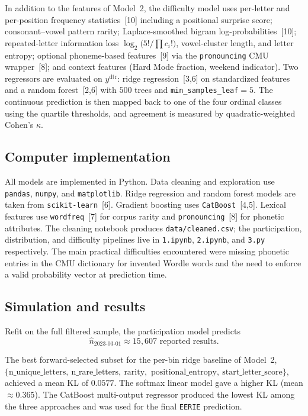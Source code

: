 \documentclass{article}
\begin{document}
In addition to the features of Model~2, the difficulty model uses per-letter
and per-position frequency statistics~[10] including a positional surprise
score; consonant--vowel pattern rarity; Laplace-smoothed bigram
log-probabilities~[10]; repeated-letter information loss
$\log_2\!\bigl(5!/\prod c_i!\bigr)$, vowel-cluster length, and letter entropy;
optional phoneme-based features~[9] via the \texttt{pronouncing} CMU
wrapper~[8]; and context features (Hard Mode fraction, weekend indicator).
Two regressors are evaluated on $y^{\mathrm{dtr}}$: ridge regression~[3,6] on
standardized features and a random forest~[2,6] with $500$ trees and
\texttt{min\_samples\_leaf}$=5$. The continuous prediction is then mapped back
to one of the four ordinal classes using the quartile thresholds, and agreement
is measured by quadratic-weighted Cohen's $\kappa$.

\subsection*{Computer implementation}
All models are implemented in Python. Data cleaning and exploration use
\texttt{pandas}, \texttt{numpy}, and \texttt{matplotlib}. Ridge regression and
random forest models are taken from \texttt{scikit-learn}~[6]. Gradient
boosting uses \texttt{CatBoost}~[4,5]. Lexical features use
\texttt{wordfreq}~[7] for corpus rarity and \texttt{pronouncing}~[8] for
phonetic attributes. The cleaning notebook produces \texttt{data/cleaned.csv};
the participation, distribution, and difficulty pipelines live in
\texttt{1.ipynb}, \texttt{2.ipynb}, and \texttt{3.py} respectively. The main
practical difficulties encountered were missing phonetic entries in the CMU
dictionary for invented Wordle words and the need to enforce a valid
probability vector at prediction time.

\subsection*{Simulation and results}

Refit on the full filtered sample, the participation model predicts
\begin{equation}
  \widehat{n}_{2023\text{-}03\text{-}01} \approx 15{,}607
  \text{ reported results.}
\end{equation}

The best forward-selected subset for the per-bin ridge baseline of Model~2,
\(\{\text{n\_unique\_letters},\ \text{n\_rare\_letters},\ \text{rarity},\)
\(\text{positional\_entropy},\ \text{start\_letter\_score}\}\), achieved a
mean KL of $0.0577$. The softmax linear model gave a higher KL
(mean $\approx 0.365$). The CatBoost multi-output regressor produced the
lowest KL among the three approaches and was used for the final
\texttt{EERIE} prediction.
\end{document}
